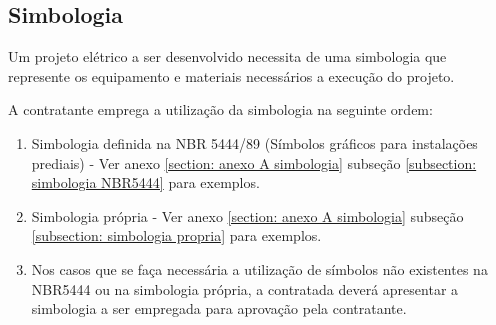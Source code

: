 \subsection{Simbologia}
Um projeto elétrico a ser desenvolvido necessita de uma simbologia que represente os equipamento e materiais necessários a execução do projeto.

A contratante emprega a utilização da simbologia na seguinte ordem:
\begin{enumerate}
	\item Simbologia definida na NBR 5444/89 (Símbolos gráficos para instalações prediais) - Ver anexo \ref{section: anexo A simbologia} subseção \ref{subsection: simbologia NBR5444} para exemplos.
	
	\item Simbologia própria - Ver anexo \ref{section: anexo A simbologia} subseção \ref{subsection: simbologia propria} para exemplos.
	
	\item Nos casos que se faça necessária a utilização de símbolos não existentes na NBR5444 ou na simbologia própria, a contratada deverá apresentar a simbologia a ser empregada para aprovação pela contratante.
\end{enumerate}